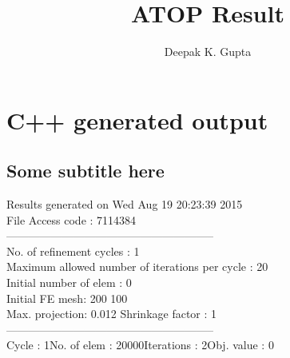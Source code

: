 \documentclass{article}
\title{ATOP Result}
\author{Deepak K. Gupta}
\begin{document}
\maketitle
\section{C++ generated output}
\subsection{Some subtitle here}
{\selectfont
Results generated  on Wed Aug 19 20:23:39 2015
\\File Access code : 7114384\\ 
--------------------------------------------------------\\ 
No. of refinement cycles : 1\\
Maximum allowed number of iterations per cycle : 20\\
Initial number of elem : 0\\ 
Initial FE mesh: 200 100\\ 
Max. projection: 0.012 Shrinkage factor : 1\\ 
--------------------------------------------------------\\ 
Cycle : 1\qquad No. of elem : 20000\qquad Iterations : 2\qquad Obj. value : 0\qquad 
}
\begin{figure}[H] 
\centering 
\begin{subfigure}{.45\linewidth} \centering 
{}  
\end{subfigure}  
\hfill  
\begin{subfigure}{.45\linewidth} \centering 
{}  
\end{subfigure}  
\end{figure}  
\end{document}
